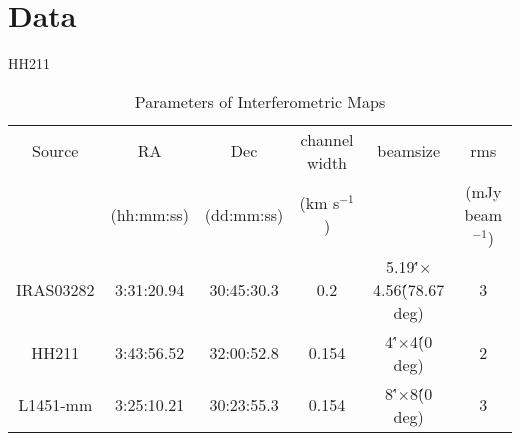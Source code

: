 \section{Data}

HH211

\cite{Tanner_2010}
\cite{Pineda_2011}
\cite{Tobin_2011}

\begin{table} 
\caption{Parameters of Interferometric Maps}
    \begin{tabular}{ c c c c c c }
        Source & RA & Dec & channel width & beamsize & rms \\ 
         & (hh:mm:ss) & (dd:mm:ss) & (km s$^{-1}$) &  & (mJy beam$^{-1}$) \\ 
        IRAS03282 & 3:31:20.94 & 30:45:30.3 & 0.2 & 5.19\'\'$\times$4.56\'\' (78.67 deg) & 3 \\ 
        HH211 & 3:43:56.52 & 32:00:52.8 & 0.154 & 4\'\'$\times$4\'\' (0 deg) & 2 \\ 
        L1451-mm & 3:25:10.21 & 30:23:55.3 & 0.154 & 8\'\'$\times$8\'\' (0 deg) & 3 \\ 
    \end{tabular} 
\end{table}
  
  
  
  
  
  
  